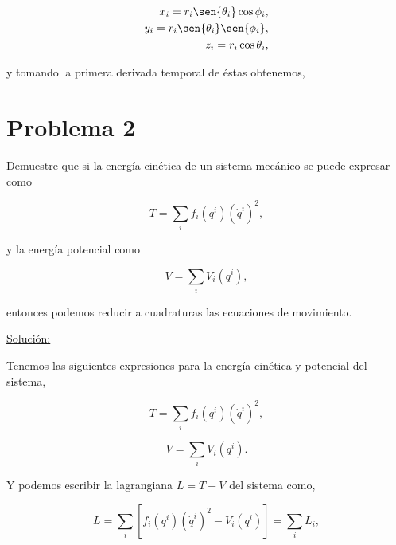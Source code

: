 \documentclass[a4paper,10pt]{article}
\numberwithin{equation}{section}
\begin{document}
\begin{align}
 x_i = r_i \sen{\theta_i}\cos{\phi_i}, \\
 y_i = r_i \sen{\theta_i}\sen{\phi_i}, \\
 z_i = r_i\cos{\theta_i},
\end{align}

y tomando la primera derivada temporal de éstas obtenemos,




% 
% 




\section{Problema 2}

Demuestre que si la energía cinética de un sistema mecánico se puede expresar como

$$
T = \sum_i f_i(q^i)(\dot{q}^i)^2,
$$

y la energía potencial como

$$
V = \sum_i V_i(q^i),
$$

entonces podemos reducir a cuadraturas las ecuaciones de movimiento.

\vspace{.3cm}

\underline{Solución:} \vspace{.3cm}

Tenemos las siguientes expresiones para la energía cinética y potencial del sistema,

\begin{equation}
 T = \sum_i f_i(q^i)(\dot{q}^i)^2,
 \label{eq:2cinetica1}
\end{equation}

\begin{equation}
 V = \sum_i V_i(q^i).
 \label{eq:2potencial1}
\end{equation}

Y podemos escribir la lagrangiana $L = T - V$ del sistema como,

\begin{equation}
 L = \sum_i \left[ f_i(q^i)(\dot{q}^i)^2 - V_i(q^i)\right] = \sum_i L_i,
\end{equation}
\end{document}
